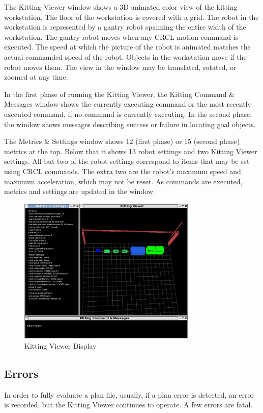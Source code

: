 The Kitting Viewer window shows a 3D animated color view of the kitting
workstation. The floor of the workstation is covered with a grid. The robot
in the workstation is represented by a gantry robot spanning the entire
width of the workstation. The gantry robot moves when any CRCL motion
command is executed. The speed at which the picture of the robot is
animated matches the actual commanded speed of the robot. Objects in the
workstation move if the robot moves them. The view in the window may be
translated, rotated, or zoomed at any time.

In the first phase of running the Kitting Viewer, the Kitting Command \&
Messages window shows the currently executing command or the most recently
executed command, if no command is currently executing. In the second
phase, the window shows messages describing success or failure in locating
goal objects.

The Metrics \& Settings window shows 12 (first phase) or 15 (second phase)
metrics at the top. Below that it shows 13 robot settings and two
Kitting Viewer settings. All but two of the robot settings correspond to
items that may be set using CRCL commands. The extra two are the
robot\rq{}s maximum speed and maximum acceleration, which may not be
reset. As commands are executed, metrics and settings are updated in the
window.
\begin{figure}[ht!]
\begin{center}
\includegraphics[width=8.5cm]{images/kittingViewer2013Feb23.jpg}
\caption{Kitting Viewer Display}
\label{fig:KittingViewer}
\end{center}
\end{figure}

\subsection{Errors}
In order to fully evaluate a plan file, usually, if a plan error is
detected, an error is recorded, but the Kitting Viewer continues to operate.
A few errors are fatal.
  
